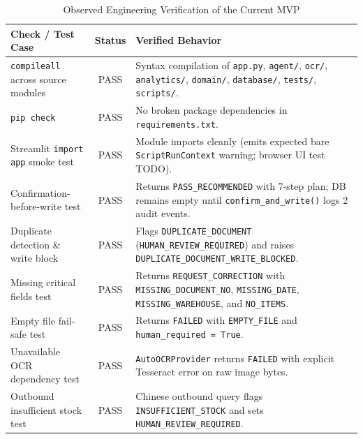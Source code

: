 \documentclass[conference]{IEEEtran}
\begin{document}
\begin{table}[t]
\caption{Observed Engineering Verification of the Current MVP}
\label{tab:mvp_tests}
\centering
\footnotesize
\setlength{\tabcolsep}{3pt}
\begin{tabular}{|>{\raggedright\arraybackslash}p{2.45cm}|c|>{\raggedright\arraybackslash}p{4.35cm}|}
\hline
\textbf{Check / Test Case} & \textbf{Status} & \textbf{Verified Behavior} \\
\hline
\texttt{compileall} across source modules & PASS & Syntax compilation of \texttt{app.py}, \texttt{agent/}, \texttt{ocr/}, \texttt{analytics/}, \texttt{domain/}, \texttt{database/}, \texttt{tests/}, \texttt{scripts/}. \\
\hline
\texttt{pip check} & PASS & No broken package dependencies in \texttt{requirements.txt}. \\
\hline
Streamlit \texttt{import app} smoke test & PASS & Module imports cleanly (emits expected bare \texttt{ScriptRunContext} warning; browser UI test TODO). \\
\hline
Confirmation-before-write test & PASS & Returns \texttt{PASS\_\allowbreak RECOMMENDED} with 7-step plan; DB remains empty until \texttt{confirm\_\allowbreak and\_\allowbreak write()} logs 2 audit events. \\
\hline
Duplicate detection \& write block & PASS & Flags \texttt{DUPLICATE\_\allowbreak DOCUMENT} (\texttt{HUMAN\_\allowbreak REVIEW\_\allowbreak REQUIRED}) and raises \texttt{DUPLICATE\_\allowbreak DOCUMENT\_\allowbreak WRITE\_\allowbreak BLOCKED}. \\
\hline
Missing critical fields test & PASS & Returns \texttt{REQUEST\_\allowbreak CORRECTION} with \texttt{MISSING\_\allowbreak DOCUMENT\_\allowbreak NO}, \texttt{MISSING\_\allowbreak DATE}, \texttt{MISSING\_\allowbreak WAREHOUSE}, and \texttt{NO\_\allowbreak ITEMS}. \\
\hline
Empty file fail-safe test & PASS & Returns \texttt{FAILED} with \texttt{EMPTY\_\allowbreak FILE} and \texttt{human\_\allowbreak required = True}. \\
\hline
Unavailable OCR dependency test & PASS & \texttt{AutoOCRProvider} returns \texttt{FAILED} with explicit Tesseract error on raw image bytes. \\
\hline
Outbound insufficient stock test & PASS & Chinese outbound query flags \texttt{INSUFFICIENT\_\allowbreak STOCK} and sets \texttt{HUMAN\_\allowbreak REVIEW\_\allowbreak REQUIRED}. \\
\hline
\end{tabular}
\end{table}
\end{document}
